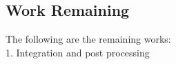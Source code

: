 \subsection{Work Remaining}
The following are the remaining works:\\
1.	Integration and post processing\\

\renewcommand\bibname{References} %




